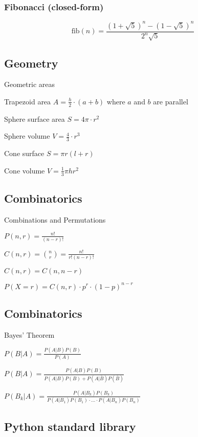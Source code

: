\documentclass[8pt,a4paper,landscape,oneside]{amsart}
\begin{document}
\begin{multicols*}{3}
        \subsubsection{Fibonacci (closed-form)}
            $$\text{fib}(n) = \frac{(1+\sqrt{5})^n - (1-\sqrt{5})^n}{2^n\sqrt{5}}$$

    \subsection{Geometry}
        Geometric areas
    
        Trapezoid area $A = \frac{h}{2} \cdot (a + b)$ where $a$ and $b$ are parallel

        Sphere surface area $S = 4\pi \cdot r^2$
        
        Sphere volume $V = \frac{4}{3} \cdot r^3$
        
        Cone surface $S = \pi r(l+r)$
        
        Cone volume $V = \frac{1}{3}\pi hr^2$

    \subsection{Combinatorics}
        Combinations and Permutations
        
        $P(n,r) = \frac{n!}{(n-r)!}$
        
        $C(n,r) = \binom{n}{r} = \frac{n!}{r!(n-r)!}$
        
        $C(n,r) = C(n, n-r)$
        
        $P(X=r) = C(n,r) \cdot p^r \cdot (1-p)^{n-r}$

    \subsection{Combinatorics}
        Bayes' Theorem

        $P(B|A) = \frac{P(A|B) P(B)}{P(A)}$
        
        $P(B|A) = \frac{P(A|B)P(B)}{P(A|B)P(B) + P(A|\bar{B})P(\bar{B})}$
        
        $P(B_k|A) = \frac{P(A|B_k)P(B_k)}{P(A|B_1)P(B_1) \cdot ... \cdot P(A|B_n)P(B_n)}$

\end{multicols*}

\onecolumn
\begin{multicols*}{3}

    \section{Python standard library}

\end{multicols*}
\end{document}
